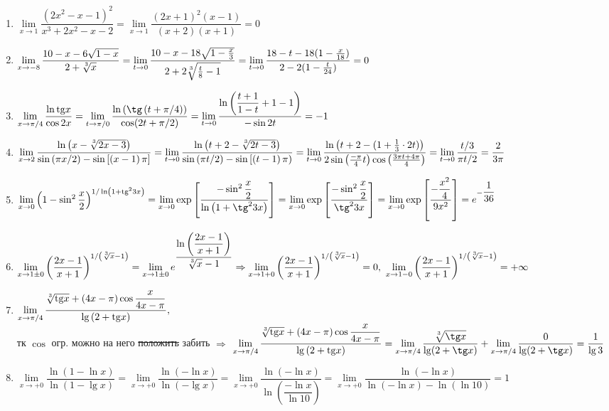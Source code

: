 \documentclass{report}
\begin{document}
\sol
\begin{enumerate}
\item
$
\lim\limits_{x\to1}\dfrac{\left(2x^{2}-x-1\right)^{2}}{x^{3}+2x^{2}-x-2}=\lim\limits_{x\to1}\dfrac{(2x+1)^2(x-1)}{(x+2)(x+1)}=0
$
\item
$
		\lim\limits_{x\to-8}\dfrac{10-x-6\sqrt{1-x}}{2+\sqrt[\leftroot{0}\uproot{2}3]{x}}=\lim\limits_{t\to0}\dfrac{10-x-18\sqrt{1-\frac{x}{3}}}{2+2\sqrt[\leftroot{0}\uproot{2}3]{\frac{t}{8}-1}}=\lim\limits_{t\to0} \dfrac{18-t-18(1-\frac{x}{18})}{2-2(1-\frac{t}{24})}=0
$
\item
$
\lim\limits_{x\to\pi/4}\dfrac{\ln\mathrm{tg}x}{\cos2x}=\lim\limits_{t\to\pi/0}\dfrac{\ln\left(\tg \left(t+\pi/4\right) \right)}{\cos (2t +\pi/2)}= \lim\limits_{t\to0}\dfrac{\ln\left(\dfrac{t+1}{1-t}+1-1\right)}{-\sin 2t}=-1
$
\item
$
\lim\limits_{x\to2}\dfrac{\ln\left(x-\sqrt[\leftroot{0}\uproot{2}3]{2x-3}\right)}{\sin\left(\pi x/2\right)-\sin\left[\left(x-1\right)\pi\right]}=
\lim\limits_{t\to0}\dfrac{\ln\left(t+2-\sqrt[\leftroot{0}\uproot{2}3]{2t-3}\right)}{\sin\left(\pi t/2\right)-\sin\left[\left(t-1\right)\pi\right)}=
\lim\limits_{t\to0}\dfrac{\ln\left(t+2-(1+\frac{1}{3}\cdot2t)\right)}{2\sin\left(\frac{-\pi}{4}t\right)\cos\left(\frac{3\pi t+4\pi}{4}\right)}=
		\lim\limits_{t\to0}\dfrac{t/3}{\pi t/2}=\dfrac{2}{3\pi}
$
\item
$
\lim\limits_{x\to0}\left(1-\sin^2\dfrac{x}{2}\right)^{1/\ln\left(1+\mathrm{tg}^23x\right)}=\lim\limits_{x\to0}\exp\left[\dfrac{-\sin^2\dfrac{x}{2}}{\ln\left(1+\tg^2 3x\right)}\right]=
\lim\limits_{x\to0}\exp\left[\dfrac{-\sin^2\dfrac{x}{2}}{\tg^2 3x}\right]=\lim\limits_{x\to0}\exp\left[\dfrac{-\dfrac{x^2}{4}}{9x^2}\right]=e^{-\dfrac{1}{36}}
$

\item
$
\lim\limits_{x\to1\pm0}\left(\dfrac{2x-1}{x+1}\right)^{1/\left(\sqrt[\leftroot{0}\uproot{2}3]{x}-1\right)}=\lim\limits_{x\to1\pm0} e^{\dfrac{\ln\left(\dfrac{2x-1}{x+1}\right)}{\sqrt[\leftroot{0}\uproot{2}3]{x}-1}}\Rightarrow
\lim\limits_{x\to1+0}\left(\dfrac{2x-1}{x+1}\right)^{1/\left(\sqrt[\leftroot{0}\uproot{2}3]{x}-1\right)}=0,\ \lim\limits_{x\to1-0}\left(\dfrac{2x-1}{x+1}\right)^{1/\left(\sqrt[\leftroot{0}\uproot{2}3]{x}-1\right)}=+\infty
$
\item
$
\lim\limits_{x\to\pi/4}\dfrac{\sqrt[\leftroot{0}\uproot{2}3]{\mathrm{tg}x}+(4x-\pi)\cos\dfrac{x}{4x-\pi}}{\lg\left(2+\mathrm{tg}x\right)},
$
\\
тк $\cos$ огр. можно на него \sout{положить} забить $\Rightarrow$
$
\lim\limits_{x\to\pi/4}\dfrac{\sqrt[\leftroot{0}\uproot{2}3]{\mathrm{tg}x}+(4x-\pi)\cos\dfrac{x}{4x-\pi}}{\lg\left(2+\mathrm{tg}x\right)}=
\lim\limits_{x\to\pi/4}\dfrac{\sqrt[\leftroot{0}\uproot{2}3]{\tg x}}{\lg(2+\tg x)}+\lim\limits_{x\to\pi/4}\dfrac{0}{\lg(2+\tg x)}=\dfrac{1}{\lg 3}
$
\item
$
\lim\limits_{x\to+0}\dfrac{\ln\left(1-\ln x\right)}{\ln\left(1-\lg x\right)}=\lim\limits_{x\to+0}\dfrac{\ln(-\ln x)}{\ln(-\lg x)}=
\lim\limits_{x\to+0}\dfrac{\ln(-\ln x)}{\ln\left(\dfrac{-\ln x}{\ln 10}\right)}=\lim\limits_{x\to+0}\dfrac{\ln(-\ln x)}{\ln (-\ln x)-\ln(\ln 10)}=1
$
\end{enumerate}
\end{document}
